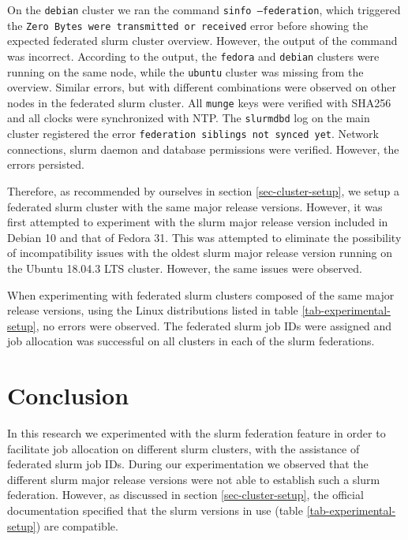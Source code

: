 \documentclass[conference]{IEEEtran}
\begin{document}
On the \texttt{debian} cluster we ran the command \texttt{sinfo --federation}, which triggered the \texttt{Zero Bytes were transmitted or received} error before showing the expected federated \gls{slurm} cluster overview. However, the output of the command was incorrect. According to the output, the \texttt{fedora} and \texttt{debian} clusters were running on the same node, while the \texttt{ubuntu} cluster was missing from the overview. Similar errors, but with different combinations were observed on other nodes in the federated \gls{slurm} cluster. All \texttt{munge} keys were verified with SHA256 and all clocks were synchronized with NTP. The \texttt{slurmdbd} log on the main cluster registered the error \texttt{federation siblings not synced yet}. Network connections, \gls{slurm} daemon and database permissions were verified. However, the errors persisted.

Therefore, as recommended by ourselves in section \ref{sec-cluster-setup}, we setup a federated \gls{slurm} cluster with the same major release versions. However, it was first attempted to experiment with the \gls{slurm} major release version included in Debian 10 and that of Fedora 31. This was attempted to eliminate the possibility of incompatibility issues with the oldest \gls{slurm} major release version running on the Ubuntu 18.04.3 LTS cluster. However, the same issues were observed.

When experimenting with federated \gls{slurm} clusters composed of the same major release versions, using the Linux distributions listed in table \ref{tab-experimental-setup}, no errors were observed. The federated \gls{slurm} job IDs were assigned and job allocation was successful on all clusters in each of the \gls{slurm} federations.


\section{Conclusion}
In this research we experimented with the \gls{slurm} federation feature in order to facilitate job allocation on different \gls{slurm} clusters, with the assistance of federated \gls{slurm} job IDs. During our experimentation we observed that the different \gls{slurm} major release versions were not able to establish such a \gls{slurm} federation. However, as discussed in section \ref{sec-cluster-setup}, the official documentation specified that the \gls{slurm} versions in use (table \ref{tab-experimental-setup}) are compatible.
\end{document}
